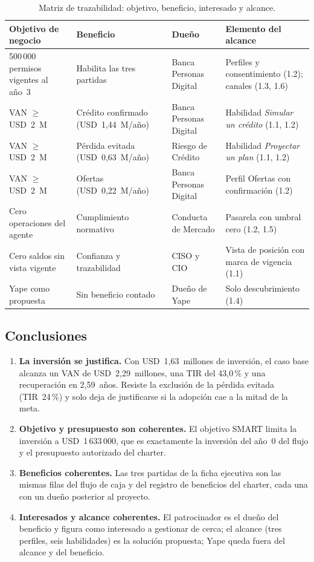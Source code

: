 \documentclass[11pt,a4paper]{article}
\newcommand{\usd}[1]{USD~#1}
\begin{document}
\begin{table}[H]
\centering
\caption{Matriz de trazabilidad: objetivo, beneficio, interesado y alcance.}
\small
\setlength{\tabcolsep}{4pt}
\begin{tabularx}{\textwidth}{@{}X p{2.8cm} p{3.0cm} X@{}}
\toprule
\textbf{Objetivo de negocio} & \textbf{Beneficio} & \textbf{Dueño} & \textbf{Elemento del alcance} \\
\midrule
500\,000 permisos vigentes al año~3 & Habilita las tres partidas & Banca Personas Digital & Perfiles y consentimiento (1.2); canales (1.3, 1.6) \\
VAN $\geq$ \usd{2}~M & Crédito confirmado (\usd{1,44}~M/año) & Banca Personas Digital & Habilidad \textit{Simular un crédito} (1.1, 1.2) \\
VAN $\geq$ \usd{2}~M & Pérdida evitada (\usd{0,63}~M/año) & Riesgo de Crédito & Habilidad \textit{Proyectar un plan} (1.1, 1.2) \\
VAN $\geq$ \usd{2}~M & Ofertas (\usd{0,22}~M/año) & Banca Personas Digital & Perfil Ofertas con confirmación (1.2) \\
Cero operaciones del agente & Cumplimiento normativo & Conducta de Mercado & Pasarela con umbral cero (1.2, 1.5) \\
Cero saldos sin vista vigente & Confianza y trazabilidad & CISO y CIO & Vista de posición con marca de vigencia (1.1) \\
Yape como propuesta & Sin beneficio contado & Dueño de Yape & Solo descubrimiento (1.4) \\
\bottomrule
\end{tabularx}
\end{table}

\subsection*{Conclusiones}

\begin{enumerate}
  \item \textbf{La inversión se justifica.} Con \usd{1,63}~millones de inversión, el caso base alcanza un VAN de \usd{2,29}~millones, una TIR del 43,0\,\% y una recuperación en 2,59~años. Resiste la exclusión de la pérdida evitada (TIR~24\,\%) y solo deja de justificarse si la adopción cae a la mitad de la meta.
  \item \textbf{Objetivo y presupuesto son coherentes.} El objetivo SMART limita la inversión a \usd{1\,633\,000}, que es exactamente la inversión del año~0 del flujo y el presupuesto autorizado del charter.
  \item \textbf{Beneficios coherentes.} Las tres partidas de la ficha ejecutiva son las mismas filas del flujo de caja y del registro de beneficios del charter, cada una con un dueño posterior al proyecto.
  \item \textbf{Interesados y alcance coherentes.} El patrocinador es el dueño del beneficio y figura como interesado a gestionar de cerca; el alcance (tres perfiles, seis habilidades) es la solución propuesta; Yape queda fuera del alcance y del beneficio.
\end{enumerate}
\end{document}
